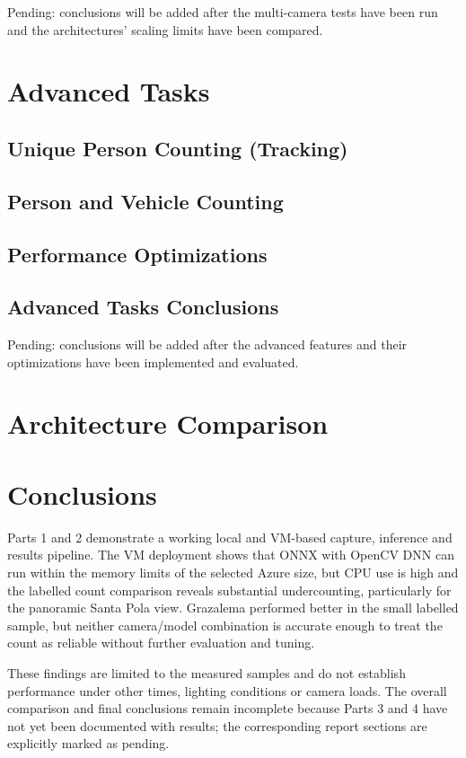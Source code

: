 \documentclass{article}
\begin{document}
    Pending: conclusions will be added after the multi-camera tests have been run and the architectures' scaling limits have been compared.

\section{Advanced Tasks}
    \subsection{Unique Person Counting (Tracking)}
    \subsection{Person and Vehicle Counting}
    \label{sec:vehicles}
    \subsection{Performance Optimizations}
    \subsection{Advanced Tasks Conclusions}

    Pending: conclusions will be added after the advanced features and their optimizations have been implemented and evaluated.

\section{Architecture Comparison}                  %
\section{Conclusions}

Parts 1 and 2 demonstrate a working local and VM-based capture, inference and results pipeline. The VM deployment shows that ONNX with OpenCV DNN can run within the memory limits of the selected Azure size, but CPU use is high and the labelled count comparison reveals substantial undercounting, particularly for the panoramic Santa Pola view. Grazalema performed better in the small labelled sample, but neither camera/model combination is accurate enough to treat the count as reliable without further evaluation and tuning.

These findings are limited to the measured samples and do not establish performance under other times, lighting conditions or camera loads. The overall comparison and final conclusions remain incomplete because Parts 3 and 4 have not yet been documented with results; the corresponding report sections are explicitly marked as pending.
\end{document}
